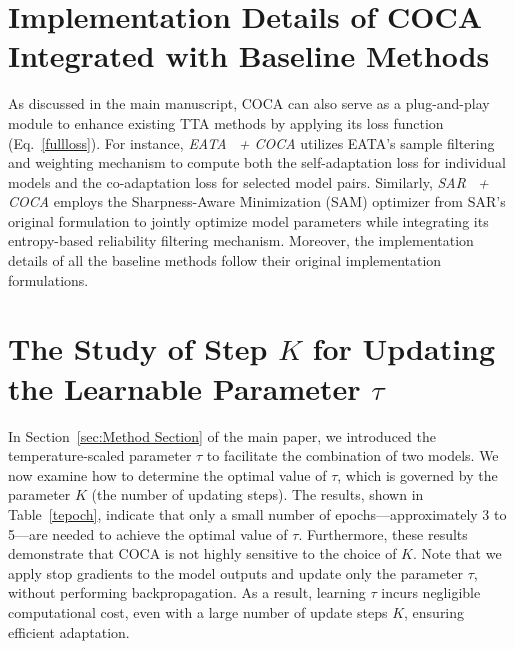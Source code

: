 \section{Implementation Details of COCA Integrated with Baseline Methods}
\label{imdeatils}
As discussed in the main manuscript, COCA can also serve as a plug-and-play module to enhance existing TTA methods by applying its loss function (Eq.~\ref{fullloss}). For instance, \textit{EATA~\cite{niu2022efficient} + COCA} utilizes EATA's sample filtering and weighting mechanism to compute both the self-adaptation loss for individual models and the co-adaptation loss for selected model pairs. Similarly, \textit{SAR~\cite{niu2023towards} + COCA} employs the Sharpness-Aware Minimization (SAM) optimizer from SAR's original formulation to jointly optimize model parameters while integrating its entropy-based reliability filtering mechanism. Moreover, the implementation details of all the baseline methods follow their original implementation formulations.

\section{The Study of Step $K$ for Updating the Learnable Parameter $\tau$}
\label{kstudy}
In Section~\ref{sec:Method Section} of the main paper, we introduced the temperature-scaled parameter $\tau$  to facilitate the combination of two models. We now examine how to determine the optimal value of $\tau$, which is governed by the parameter $K$ (the number of updating steps). The results, shown in Table~\ref{tepoch}, indicate that only a small number of epochs—approximately 3 to 5—are needed to achieve the optimal value of $\tau$. Furthermore, these results demonstrate that COCA is not highly sensitive to the choice of $K$. Note that we apply stop gradients to the model outputs and update only the parameter $\tau$, without performing backpropagation. As a result, learning $\tau$ incurs negligible computational cost, even with a large number of update steps $K$, ensuring efficient adaptation.






